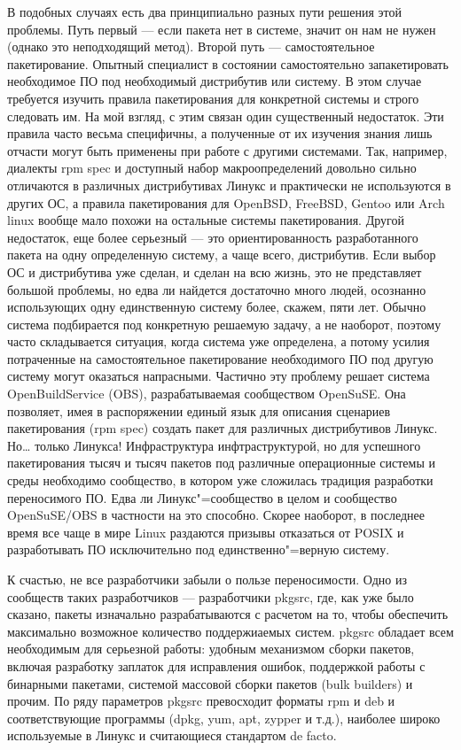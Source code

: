 \documentclass[10pt, a5paper]{article}
\begin{document}
В подобных случаях есть два принципиально разных пути решения этой проблемы. Путь первый --- если пакета нет в системе, значит он нам не нужен (однако это неподходящий метод). Второй путь --- самостоятельное пакетирование. Опытный специалист в состоянии самостоятельно запакетировать необходимое ПО под необходимый дистрибутив или систему. В этом случае требуется изучить правила пакетирования для конкретной системы и строго следовать им. На мой взгляд, с этим связан один существенный недостаток. Эти правила часто весьма специфичны, а полученные от их изучения знания лишь отчасти могут быть применены при работе с другими системами. Так, например, диалекты rpm spec и доступный набор макроопределений довольно сильно отличаются в различных дистрибутивах Линукс и практически не используются в других ОС, а правила пакетирования для OpenBSD, FreeBSD, Gentoo или Arch linux вообще мало похожи на остальные системы пакетирования. Другой недостаток, еще более серьезный --- это ориентированность разработанного пакета на одну определенную систему, а чаще всего, дистрибутив. Если выбор ОС и дистрибутива уже сделан, и сделан на всю жизнь, это не представляет большой проблемы, но едва ли найдется достаточно много людей, осознанно использующих одну единственную систему более, скажем, пяти лет. Обычно система подбирается под конкретную решаемую задачу, а не наоборот, поэтому часто складывается ситуация, когда система уже определена, а потому усилия потраченные на самостоятельное пакетирование необходимого ПО под другую систему могут оказаться напрасными. Частично эту проблему решает система OpenBuildService (OBS), разрабатываемая сообществом OpenSuSE. Она позволяет, имея в распоряжении единый язык для описания сценариев пакетирования (rpm spec) создать пакет для различных дистрибутивов Линукс. Но\ldots{} только Линукса! Инфраструктура инфтраструктурой, но для успешного пакетирования тысяч и тысяч пакетов под различные операционные системы и среды необходимо сообщество, в котором уже сложилась традиция разработки переносимого ПО. Едва ли Линукс"=сообщество в целом и сообщество OpenSuSE/OBS в частности на это способно. Скорее наоборот, в последнее время все чаще в мире Linux раздаются призывы отказаться от POSIX и разработывать ПО исключительно под единственно"=верную систему.

К счастью, не все разработчики забыли о пользе переносимости. Одно из сообществ таких разработчиков --- разработчики pkgsrc, где, как уже было сказано, пакеты изначально разрабатываются с расчетом на то, чтобы обеспечить максимально возможное количество поддержиаемых систем. pkgsrc обладает всем необходимым для серьезной работы: удобным механизмом сборки пакетов, включая разработку заплаток для исправления ошибок, поддержкой работы с бинарными пакетами, системой массовой сборки пакетов (bulk builders) и прочим. По ряду параметров pkgsrc превосходит форматы rpm и deb и соответствующие программы (dpkg, yum, apt, zypper и т.д.), наиболее широко используемые в Линукс и считающиеся стандартом de facto. 
\end{document}

